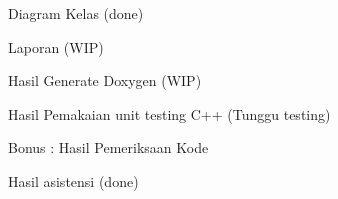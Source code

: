 
\begin{DoxyEnumerate}
\item Diagram Kelas (done)
\item Laporan (W\+IP)
\item Hasil Generate Doxygen (W\+IP)
\item Hasil Pemakaian unit testing C++ (Tunggu testing)
\item Bonus \+: Hasil Pemeriksaan Kode
\item Hasil asistensi (done) 
\end{DoxyEnumerate}